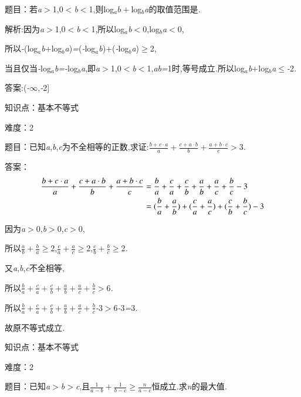 \documentclass{article} %
\begin{document}
 题目：若\textit{a$>$}1,0\textit{$<$b$<$}1,则log\textit{${}_{a}$$b+$}log\textit{${}_{b}$a}的取值范围是\textit{\underbar{　　　　}.~}

 解析:因为\textit{a$>$}1,0\textit{$<$b$<$}1,所以log\textit{${}_{a}$b$<$}0,log\textit{${}_{b}$a$<$}0,

所以\textit{-}(log\textit{${}_{a}$b$+$}log\textit{${}_{b}$a})\textit{=}(\textit{-}log\textit{${}_{a}$b})\textit{$+$}(\textit{-}log\textit{${}_{b}$a})$\mathrm{\ge}$2,

当且仅当\textit{-}log\textit{${}_{a}$b=-}log\textit{${}_{b}$a},即\textit{a$>$}1,0\textit{$<$b$<$}1,\textit{ab=}1时,等号成立\textit{.}所以log\textit{${}_{a}$b$+$}log\textit{${}_{b}$a}$\mathrm{\le}$\textit{-}2\textit{.}

 答案:(\textit{-$\infty$},\textit{-}2]

知识点：基本不等式

难度：2

 题目：已知\textit{a},\textit{b},\textit{c}为不全相等的正数,求证:$\frac{b+c\cdot a}{a}+\frac{c+a\cdot b}{b}+\frac{a+b\cdot c}{c}$\textit{$>$}3\textit{.}

 答案：
\begin{align}
\notag
\frac{b+c\cdot a}{a}+\frac{c+a\cdot b}{b}+\frac{a+b\cdot c}{c}
&=\frac{b}{a}+\frac{c}{a}+\frac{c}{b}+\frac{a}{b}+\frac{a}{c}+\frac{b}{c}-3\\ \notag
&=(\frac{b}{a}+\frac{a}{b})+(\frac{c}{a}+\frac{a}{c})+(\frac{c}{b}+\frac{b}{c})-3	\notag
\end{align}


因为\textit{a$>$}0,\textit{b$>$}0,\textit{c$>$}0,

所以$\frac{a}{b}+\frac{b}{a}$$\mathrm{\ge}$2,$\frac{c}{a}+\frac{a}{c}$$\mathrm{\ge}$2,$\frac{c}{b}+\frac{b}{c}$$\mathrm{\ge}$2\textit{.}

又\textit{a},\textit{b},\textit{c}不全相等,

所以$\frac{b}{a}+\frac{c}{a}+\frac{c}{b}+\frac{a}{b}+\frac{a}{c}+\frac{b}{c}$\textit{$>$}6\textit{.}

所以$\frac{b}{a}+\frac{c}{a}+\frac{c}{b}+\frac{a}{b}+\frac{a}{c}+\frac{b}{c}$\textit{-}3\textit{$>$}6\textit{-}3\textit{=}3\textit{.}

故原不等式成立\textit{.}

知识点：基本不等式

难度：2

 题目：已知\textit{a$>$b$>$c},且$\frac{1}{a-b}+\frac{1}{b-c} \ge \frac{n}{a-c}$恒成立\textit{.}求\textit{n}的最大值\textit{.}
\end{document}
